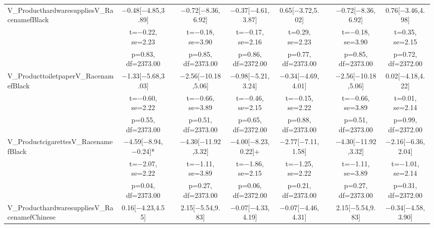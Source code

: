 \documentclass[]{report}
\begin{document}
\begin{table}
{\begin{tabular}[t]{lcccccccc}
		V\_ProducthardwaresuppliesV\_RacenamefBlack & \num{-0.48}[\num{-4.85},\num{3.89}] &  & \num{-0.72}[\num{-8.36},\num{6.92}] & \num{-0.37}[\num{-4.61},\num{3.87}] & \num{0.65}[\num{-3.72},\num{5.02}] &  & \num{-0.72}[\num{-8.36},\num{6.92}] & \num{0.76}[\num{-3.46},\num{4.98}]\\
		& t=\num{-0.22}, se=\num{2.23} &  & t=\num{-0.18}, se=\num{3.90} & t=\num{-0.17}, se=\num{2.16} & t=\num{0.29}, se=\num{2.23} &  & t=\num{-0.18}, se=\num{3.90} & t=\num{0.35}, se=\num{2.15}\\
		& p=\num{0.83}, df=\num{2373.00} &  & p=\num{0.85}, df=\num{2373.00} & p=\num{0.86}, df=\num{2372.00} & p=\num{0.77}, df=\num{2373.00} &  & p=\num{0.85}, df=\num{2373.00} & p=\num{0.72}, df=\num{2372.00}\\
		V\_ProducttoiletpaperV\_RacenamefBlack & \num{-1.33}[\num{-5.68},\num{3.03}] &  & \num{-2.56}[\num{-10.18},\num{5.06}] & \num{-0.98}[\num{-5.21},\num{3.24}] & \num{-0.34}[\num{-4.69},\num{4.01}] &  & \num{-2.56}[\num{-10.18},\num{5.06}] & \num{0.02}[\num{-4.18},\num{4.22}]\\
		& t=\num{-0.60}, se=\num{2.22} &  & t=\num{-0.66}, se=\num{3.89} & t=\num{-0.46}, se=\num{2.15} & t=\num{-0.15}, se=\num{2.22} &  & t=\num{-0.66}, se=\num{3.89} & t=\num{0.01}, se=\num{2.14}\\
		& p=\num{0.55}, df=\num{2373.00} &  & p=\num{0.51}, df=\num{2373.00} & p=\num{0.65}, df=\num{2372.00} & p=\num{0.88}, df=\num{2373.00} &  & p=\num{0.51}, df=\num{2373.00} & p=\num{0.99}, df=\num{2372.00}\\
		V\_ProductcigarettesV\_RacenamefBlack & \num{-4.59}[\num{-8.94},\num{-0.24}]* &  & \num{-4.30}[\num{-11.92},\num{3.32}] & \num{-4.00}[\num{-8.23},\num{0.22}]+ & \num{-2.77}[\num{-7.11},\num{1.58}] &  & \num{-4.30}[\num{-11.92},\num{3.32}] & \num{-2.16}[\num{-6.36},\num{2.04}]\\
		& t=\num{-2.07}, se=\num{2.22} &  & t=\num{-1.11}, se=\num{3.89} & t=\num{-1.86}, se=\num{2.15} & t=\num{-1.25}, se=\num{2.22} &  & t=\num{-1.11}, se=\num{3.89} & t=\num{-1.01}, se=\num{2.14}\\
		& p=\num{0.04}, df=\num{2373.00} &  & p=\num{0.27}, df=\num{2373.00} & p=\num{0.06}, df=\num{2372.00} & p=\num{0.21}, df=\num{2373.00} &  & p=\num{0.27}, df=\num{2373.00} & p=\num{0.31}, df=\num{2372.00}\\
		V\_ProducthardwaresuppliesV\_RacenamefChinese & \num{0.16}[\num{-4.23},\num{4.55}] &  & \num{2.15}[\num{-5.54},\num{9.83}] & \num{-0.07}[\num{-4.33},\num{4.19}] & \num{-0.07}[\num{-4.46},\num{4.31}] &  & \num{2.15}[\num{-5.54},\num{9.83}] & \num{-0.34}[\num{-4.58},\num{3.90}]\\

\end{tabular}}
\end{table}
\end{document}
